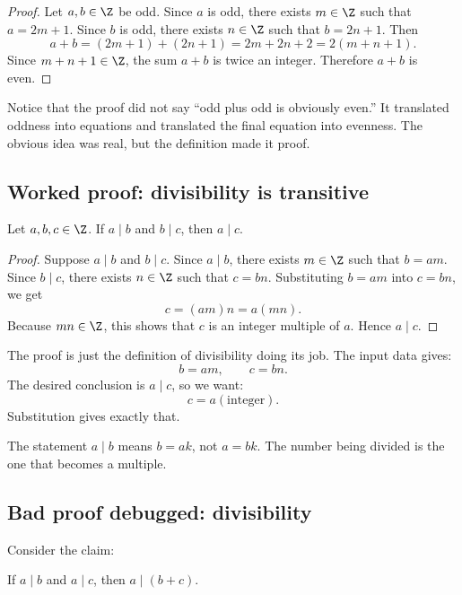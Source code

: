 \begin{proof}
Let $a,b\in\Z$ be odd. Since $a$ is odd, there exists $m\in\Z$ such that $a=2m+1$. Since $b$ is odd, there exists $n\in\Z$ such that $b=2n+1$. Then
\[
a+b=(2m+1)+(2n+1)=2m+2n+2=2(m+n+1).
\]
Since $m+n+1\in\Z$, the sum $a+b$ is twice an integer. Therefore $a+b$ is even.
\end{proof}

Notice that the proof did not say ``odd plus odd is obviously even.'' It translated oddness into equations and translated the final equation into evenness. The obvious idea was real, but the definition made it proof.

\subsection{Worked proof: divisibility is transitive}

\begin{theorem}
Let $a,b,c\in\Z$. If $a\mid b$ and $b\mid c$, then $a\mid c$.
\end{theorem}

\begin{proof}
Suppose $a\mid b$ and $b\mid c$. Since $a\mid b$, there exists $m\in\Z$ such that $b=am$. Since $b\mid c$, there exists $n\in\Z$ such that $c=bn$. Substituting $b=am$ into $c=bn$, we get
\[
c=(am)n=a(mn).
\]
Because $mn\in\Z$, this shows that $c$ is an integer multiple of $a$. Hence $a\mid c$.
\end{proof}

The proof is just the definition of divisibility doing its job. The input data gives:
\[
b=am,\qquad c=bn.
\]
The desired conclusion is $a\mid c$, so we want:
\[
c=a(\text{integer}).
\]
Substitution gives exactly that.

\begin{trapbox}
The statement $a\mid b$ means $b=ak$, not $a=bk$. The number being divided is the one that becomes a multiple.
\end{trapbox}

\subsection{Bad proof debugged: divisibility}

Consider the claim:

\begin{theorem}
If $a\mid b$ and $a\mid c$, then $a\mid(b+c)$.
\end{theorem}

